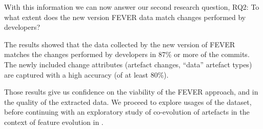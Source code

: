 With this information we can now answer our second research question, RQ2: To what extent does the new version FEVER data match changes performed by developers?

\begin{framed}
The results showed that the data collected by the new version of FEVER matches the changes performed by developers in 87\% or more of the commits.
The newly included change attributes (artefact changes, ``data'' artefact types) are captured with a high accuracy (of at least 80\%).
\end{framed}

Those results give us confidence on the viability of the FEVER approach, and in the quality of the extracted data.
We proceed to explore usages of the dataset, before continuing with an exploratory study of co-evolution of artefacts
in the context of feature evolution in .

